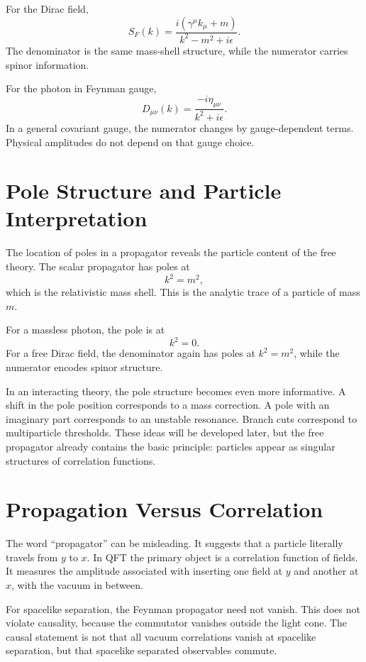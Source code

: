 For the Dirac field,
\[
    S_F(k)=\frac{i(\gamma^\mu k_\mu+m)}{k^2-m^2+i\epsilon}.
\]
The denominator is the same mass-shell structure, while the numerator carries
spinor information.

For the photon in Feynman gauge,
\[
    D_{\mu\nu}(k)=\frac{-i\eta_{\mu\nu}}{k^2+i\epsilon}.
\]
In a general covariant gauge, the numerator changes by gauge-dependent terms.
Physical amplitudes do not depend on that gauge choice.

\section{Pole Structure and Particle Interpretation}

The location of poles in a propagator reveals the particle content of the free
theory. The scalar propagator has poles at
\[
    k^2=m^2,
\]
which is the relativistic mass shell. This is the analytic trace of a particle
of mass \(m\).

For a massless photon, the pole is at
\[
    k^2=0.
\]
For a free Dirac field, the denominator again has poles at \(k^2=m^2\), while
the numerator encodes spinor structure.

In an interacting theory, the pole structure becomes even more informative. A
shift in the pole position corresponds to a mass correction. A pole with an
imaginary part corresponds to an unstable resonance. Branch cuts correspond to
multiparticle thresholds. These ideas will be developed later, but the free
propagator already contains the basic principle: particles appear as singular
structures of correlation functions.

\section{Propagation Versus Correlation}

The word ``propagator'' can be misleading. It suggests that a particle literally
travels from \(y\) to \(x\). In QFT the primary object is a correlation function
of fields. It measures the amplitude associated with inserting one field at
\(y\) and another at \(x\), with the vacuum in between.

For spacelike separation, the Feynman propagator need not vanish. This does not
violate causality, because the commutator vanishes outside the light cone. The
causal statement is not that all vacuum correlations vanish at spacelike
separation, but that spacelike separated observables commute.

